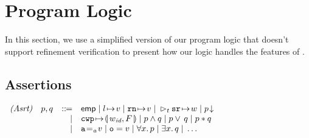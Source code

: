\section{Program Logic}
\label{sec:logic}

In this section,
we use a simplified version of our program logic
that doesn't support refinement verification to
present how our logic handles the
features of \sparc{}.


\subsection{Assertions}
\label{subsec:assertions}

\begin{center}
	$
		\begin{array}{rrcl}
			\textit{(Asrt)} & \astP, \astQ & \define &
			\aemp \sepline
			\msto{l}{\val} \sepline
			\regst{\regN}{\val} \sepline
			\dlyregst{t}{\sr}{\word} \sepline
			\asrttm{p} \\
			& & \ \ \ | &
			\frmst{\cwp}{F} \sepline
			\astP \wedge \astQ \sepline
			\astP \vee \, \astQ \sepline
			\astP \sepstar \astQ \\
			& & \ \ \ | &
			\aexp \addrEq \val \sepline
			\oexp = \val \sepline
			\forall x. \, \astP \sepline
			\exists x. \, \astQ \sepline
            \dots
		\end{array}
	$
	\label{fig:Syntax of Assertions}
	\vspace{-0.5em}
\end{center}


